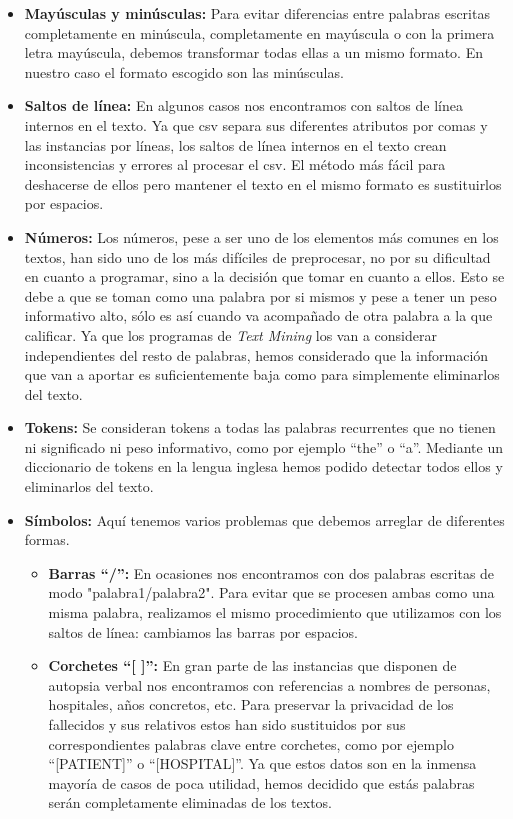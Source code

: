 \documentclass[10pt,a4paper]{article}
\begin{document}
	\begin{itemize}
		\item \textbf{Mayúsculas y minúsculas:} Para evitar diferencias entre palabras escritas completamente en minúscula, completamente en mayúscula o con la primera letra mayúscula, debemos transformar todas ellas a un mismo formato. En nuestro caso el formato escogido son las minúsculas.
		\item \textbf{Saltos de línea:} En algunos casos nos encontramos con saltos de línea internos en el texto. Ya que csv separa sus diferentes atributos por comas y las instancias por líneas, los saltos de línea internos en el texto crean inconsistencias y errores al procesar el csv. El método más fácil para deshacerse de ellos pero mantener el texto en el mismo formato es sustituirlos por espacios.
		\item \textbf{Números:} Los números, pese a ser uno de los elementos más comunes en los textos, han sido uno de los más difíciles de preprocesar, no por su dificultad en cuanto a programar, sino a la decisión que tomar en cuanto a ellos. Esto se debe a que se toman como una palabra por si mismos y pese a tener un peso informativo alto, sólo es así cuando va acompañado de otra palabra a la que calificar. Ya que los programas de \textit{Text Mining} los van a considerar independientes del resto de palabras, hemos considerado que la información que van a aportar es suficientemente baja como para simplemente eliminarlos del texto.
		\item \textbf{Tokens:} Se consideran tokens a todas las palabras recurrentes que no tienen ni significado ni peso informativo, como por ejemplo ``the'' o ``a''. Mediante un diccionario de tokens en la lengua inglesa hemos podido detectar todos ellos y eliminarlos del texto.
		\item \textbf{Símbolos:} Aquí tenemos varios problemas que debemos arreglar de diferentes formas.
		\begin{itemize}
			\item \textbf{Barras ``/'':} En ocasiones nos encontramos con dos palabras escritas de modo "palabra1/palabra2". Para evitar que se procesen ambas como una misma palabra, realizamos el mismo procedimiento que utilizamos con los saltos de línea: cambiamos las barras por espacios.
			\item \textbf{Corchetes ``[ ]'':} En gran parte de las instancias que disponen de autopsia verbal nos encontramos con referencias a nombres de personas, hospitales, años concretos, etc. Para preservar la privacidad de los fallecidos y sus relativos estos han sido sustituidos por sus correspondientes palabras clave entre corchetes, como por ejemplo ``[PATIENT]'' o ``[HOSPITAL]''. Ya que estos datos son en la inmensa mayoría de casos de poca utilidad, hemos decidido que estás palabras serán completamente eliminadas de los textos.
		\end{itemize}
	\end{itemize}
\end{document}
